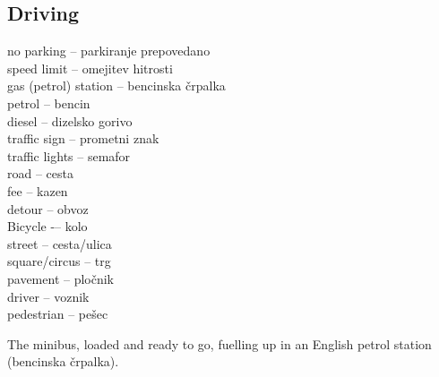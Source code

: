 \subsection{Driving}

no parking -- parkiranje prepovedano\\
speed limit -- omejitev hitrosti\\
gas (petrol) station -- bencinska črpalka\\
petrol -- bencin\\
diesel -- dizelsko gorivo\\
traffic sign -- prometni znak\\
traffic lights -- semafor\\
road -- cesta\\
fee -- kazen\\
detour -- obvoz\\
Bicycle -– kolo\\
street -- cesta/ulica\\
square/circus -- trg\\
pavement -- pločnik\\
driver -- voznik\\
pedestrian -- pešec\\


\begin{marginfigure}
\checkoddpage \ifoddpage \forcerectofloat \else \forceversofloat \fi
\centering
 \caption{The minibus, loaded and ready to go, fuelling up in an English petrol station (bencinska črpalka). }
 \label{petrol station}
\end{marginfigure}

